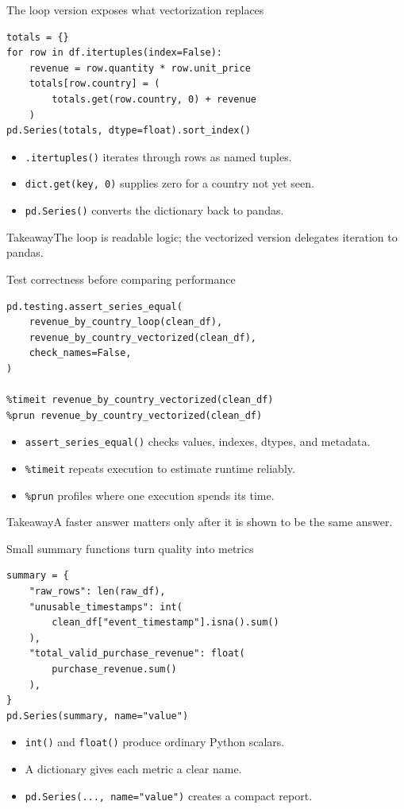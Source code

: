 \documentclass[11pt,aspectratio=43]{beamer}
\newcommand{\code}[1]{\texttt{#1}}
\newcommand{\takeaway}[1]{%
  \par\vspace{0.4em}
  \begin{block}{Takeaway}#1\end{block}}
\begin{document}
\begin{frame}[fragile]{The loop version exposes what vectorization replaces}
\begin{lstlisting}
totals = {}
for row in df.itertuples(index=False):
    revenue = row.quantity * row.unit_price
    totals[row.country] = (
        totals.get(row.country, 0) + revenue
    )
pd.Series(totals, dtype=float).sort_index()
\end{lstlisting}
\begin{itemize}
  \item \code{.itertuples()} iterates through rows as named tuples.
  \item \code{dict.get(key, 0)} supplies zero for a country not yet seen.
  \item \code{pd.Series()} converts the dictionary back to pandas.
\end{itemize}
\takeaway{The loop is readable logic; the vectorized version delegates iteration to pandas.}
\end{frame}

\begin{frame}[fragile]{Test correctness before comparing performance}
\begin{lstlisting}
pd.testing.assert_series_equal(
    revenue_by_country_loop(clean_df),
    revenue_by_country_vectorized(clean_df),
    check_names=False,
)

%timeit revenue_by_country_vectorized(clean_df)
%prun revenue_by_country_vectorized(clean_df)
\end{lstlisting}
\begin{itemize}
  \item \code{assert\_series\_equal()} checks values, indexes, dtypes, and metadata.
  \item \code{\%timeit} repeats execution to estimate runtime reliably.
  \item \code{\%prun} profiles where one execution spends its time.
\end{itemize}
\takeaway{A faster answer matters only after it is shown to be the same answer.}
\end{frame}

\begin{frame}[fragile]{Small summary functions turn quality into metrics}
\begin{lstlisting}
summary = {
    "raw_rows": len(raw_df),
    "unusable_timestamps": int(
        clean_df["event_timestamp"].isna().sum()
    ),
    "total_valid_purchase_revenue": float(
        purchase_revenue.sum()
    ),
}
pd.Series(summary, name="value")
\end{lstlisting}
\begin{itemize}
  \item \code{int()} and \code{float()} produce ordinary Python scalars.
  \item A dictionary gives each metric a clear name.
  \item \code{pd.Series(..., name="value")} creates a compact report.
\end{itemize}
\end{frame}
\end{document}
